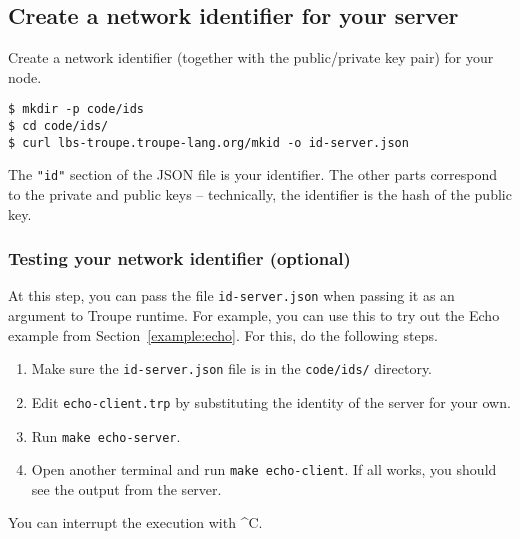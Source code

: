 \subsection{Create a network identifier for your server}
\label{sec:networkid}
Create a network identifier (together with the public/private key pair) for your node. 
\begin{verbatim}
$ mkdir -p code/ids
$ cd code/ids/
$ curl lbs-troupe.troupe-lang.org/mkid -o id-server.json
\end{verbatim}

The {\tt "id"} section of the JSON file is your identifier. The other 
parts correspond to the private and public keys -- technically,
the identifier is the hash of the public key.


\subsubsection{Testing your network identifier (optional)}
At this step, you can pass the file \verb+id-server.json+ 
when passing it as an argument to Troupe runtime. For example,
you can use this to try out the Echo example from Section~\ref{example:echo}. For this,
do the following steps.
\begin{enumerate}
\item Make sure the {\tt id-server.json} file is in the {\tt code/ids/} directory.
\item Edit {\tt echo-client.trp} by substituting the identity of the server for your own.
\item Run {\tt make echo-server}.
\item Open another terminal and run {\tt make echo-client}. If all works, you should see the output from the server.
\end{enumerate}
You can interrupt the execution with \^{}C.


